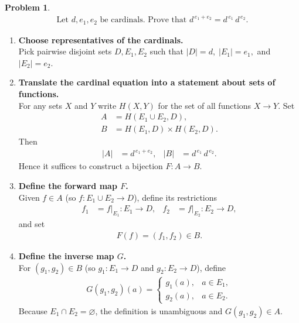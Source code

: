 \documentclass[12pt]{article}
\title{}
\author{Jerich Lee}
\date{\today}
\theoremstyle{definition} %
\newtheorem{problem}{Problem}
\theoremstyle{plain} %
\begin{document}
\maketitle
\begin{problem}
    \begin{align}
        \text{Let } d,e_1,e_2 \text{ be cardinals.  Prove that } 
        d^{\,e_1+e_2}=d^{\,e_1}\,d^{\,e_2}.
    \end{align}

    \begin{enumerate}
        \item\textbf{Choose representatives of the cardinals.}\\
              Pick pairwise disjoint sets $D,E_1,E_2$ such that 
              $|D|=d,\;|E_1|=e_1,$ and $|E_2|=e_2$.

        \item\textbf{Translate the cardinal equation into a statement about sets of functions.}\\
              For any sets $X$ and $Y$ write $H(X,Y)$ for the set of all functions $X\to Y$.  
              Set
              \begin{align}
                  A&=H(E_1\cup E_2,D),\\
                  B&=H(E_1,D)\times H(E_2,D).
              \end{align}
              Then 
              \begin{align}
                  |A|&=d^{\,e_1+e_2}, &
                  |B|&=d^{\,e_1}\,d^{\,e_2}.
              \end{align}
              Hence it suffices to construct a bijection $F:A\to B$.

        \item\textbf{Define the forward map $F$.}\\
              Given $f\in A$ (so $f:E_1\cup E_2\to D$), define its restrictions
              \begin{align}
                  f_1&=f|_{E_1}:E_1\to D, &
                  f_2&=f|_{E_2}:E_2\to D,
              \end{align}
              and set 
              \begin{align}
                  F(f)=(f_1,f_2)\in B.
              \end{align}

        \item\textbf{Define the inverse map $G$.}\\
              For $(g_1,g_2)\in B$ (so $g_1:E_1\to D$ and $g_2:E_2\to D$), define
              \begin{align}
                  G(g_1,g_2)(a)=
                  \begin{cases}
                      g_1(a), & a\in E_1,\\[4pt]
                      g_2(a), & a\in E_2.
                  \end{cases}
              \end{align}
              Because $E_1\cap E_2=\varnothing$, the definition is unambiguous and
              $G(g_1,g_2)\in A$.


\end{enumerate}
\end{problem}
\end{document}

